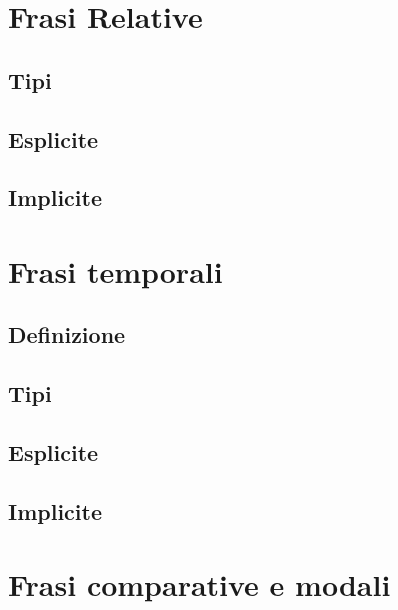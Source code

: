 \documentclass[a4paper,twoside,11pt,chapterprefix=false,bibliography=totocnumbered,listof=flat]{scrbook}
\begin{document}
\hypertarget{frasi-relative}{%
\chapter{Frasi Relative}\label{frasi-relative}}

\hypertarget{tipi}{%
\section{Tipi}\label{tipi}}

\hypertarget{esplicite-1}{%
\section{Esplicite}\label{esplicite-1}}

\hypertarget{implicite-1}{%
\section{Implicite}\label{implicite-1}}

\hypertarget{frasi-temporali}{%
\chapter{Frasi temporali}\label{frasi-temporali}}

\hypertarget{definizione}{%
\section{Definizione}\label{definizione}}

\hypertarget{tipi-1}{%
\section{Tipi}\label{tipi-1}}

\hypertarget{esplicite-2}{%
\section{Esplicite}\label{esplicite-2}}

\hypertarget{implicite-2}{%
\section{Implicite}\label{implicite-2}}

\hypertarget{frasi-comparative-e-modali}{%
\chapter{Frasi comparative e modali}\label{frasi-comparative-e-modali}}
\end{document}
